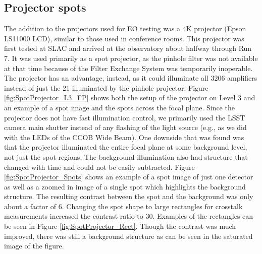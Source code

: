 \subsection{Projector spots}\label{projector-spots}
The addition to the projectors used for EO testing was a 4K projector (Epson LS11000 LCD), similar to those used in conference rooms. This projector was first tested at SLAC and arrived at the observatory about halfway through Run 7. It was used primarily as a spot projector, as the pinhole filter was not available at that time because of the Filter Exchange System was temporarily inoperable. The projector has an advantage, instead, as it could illuminate all 3206 amplifiers instead of just the 21 illuminated by the
pinhole projector. Figure \ref{fig:SpotProjector_L3_FP} shows both the setup of the projector on Level 3 and an example of a spot image and the spots across the focal plane. Since the projector does not have fast illumination control, we primarily used the LSST camera main shutter instead of any flashing of the light source (e.g., as we did with the LEDs of the CCOB Wide Beam). One downside that was found was that the projector illuminated the entire focal plane at some background level, not just the spot regions. The background illumination also had structure that changed with time and could not be easily subtracted. Figure \ref{fig:SpotProjector_Spots} shows an example of a spot image of just one detector as well as a zoomed in image of a single spot which highlights the background structure. The resulting contrast between the spot and the background was only about a factor of 6. Changing the spot shape to large rectangles for crosstalk
measurements increased the contrast ratio to 30. Examples of the rectangles can be seen in Figure \ref{fig:SpotProjector_Rect}. Though the contrast was much improved, there was still a background structure as can be seen in the saturated image of the figure.

